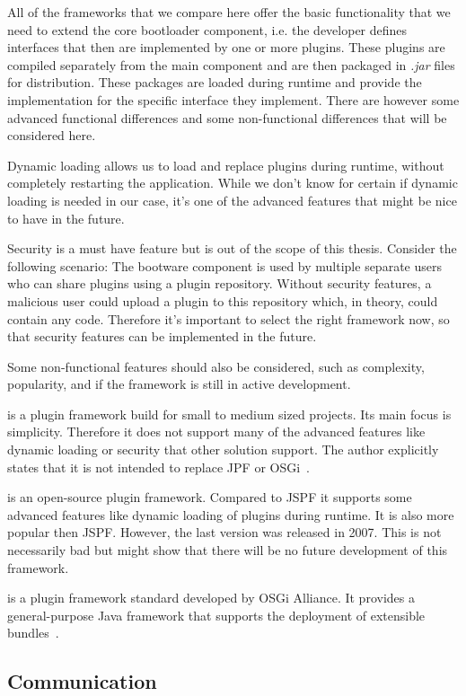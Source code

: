 All of the frameworks that we compare here offer the basic functionality that we need to extend the core bootloader component, i.e. the developer defines interfaces that then are implemented by one or more plugins.
These plugins are compiled separately from the main component and are then packaged in \textit{.jar} files for distribution.
These packages are loaded during runtime and provide the implementation for the specific interface they implement.
There are however some advanced functional differences and some non-functional differences that will be considered here.

Dynamic loading allows us to load and replace plugins during runtime, without completely restarting the application.
While we don't know for certain if dynamic loading is needed in our case, it's one of the advanced features that might be nice to have in the future.

Security is a must have feature but is out of the scope of this thesis.
Consider the following scenario: The bootware component is used by multiple separate users who can share plugins using a plugin repository.
Without security features, a malicious user could upload a plugin to this repository which, in theory, could contain any code.
Therefore it's important to select the right framework now, so that security features can be implemented in the future.

Some non-functional features should also be considered, such as complexity, popularity, and if the framework is still in active development.

 is a plugin framework build for small to medium sized projects.
Its main focus is simplicity.
Therefore it does not support many of the advanced features like dynamic loading or security that other solution support.
The author explicitly states that it is not intended to replace JPF or OSGi~\autocite{jspf:faq}.

 is an open-source plugin framework.
Compared to JSPF it supports some advanced features like dynamic loading of plugins during runtime.
It is also more popular then JSPF.
However, the last version was released in 2007.
This is not necessarily bad but might show that there will be no future development of this framework.

 is a plugin framework standard developed by OSGi Alliance.
It provides a general-purpose Java framework that supports the deployment of extensible bundles~\autocite{osgi:spec}.

\subsection{Communication}
\label{design:communication}
